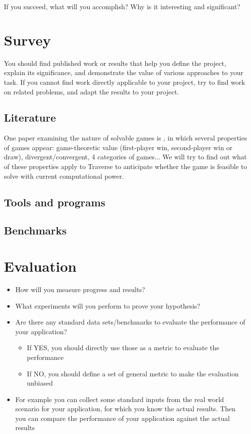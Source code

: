 \documentclass[times, 10pt,twocolumn]{article}
\begin{document}

If you succeed, what will you accomplish? Why is it interesting and significant?


\section{Survey}
You should find published work or results that help you define the project, explain its significance, and demonstrate the value of various approaches to your task. If you cannot find work directly applicable to your project, try to find work on related problems, and adapt the results to your project.

\subsection{Literature}
One paper examining the nature of solvable games is \cite{games_solved}, in which several properties of games appear: game-theoretic value (first-player win, second-player win or draw), divergent/convergent, 4 categories of games... We will try to find out what of these properties apply to Traverse to anticipate whether the game is feasible to solve with current computational power.

\subsection{Tools and programs}

\subsection{Benchmarks}

\section{Evaluation}

\begin{itemize}
	\item{How will you measure progress and results?}
	\item{What experiments will you perform to prove your hypothesis?}
	\item{Are there any standard data sets/benchmarks to evaluate the performance of your application?}
	\begin{itemize}
		\item{If YES, you should directly use those as a metric to evaluate the performance}
		\item{If NO, you should define a set of general metric to make the evaluation unbiased}
	\end{itemize}
	\item{For example you can collect some standard inputs from the real world scenario for your application, for which you know the actual results. Then you can compare the performance of your application against the actual results}
\end{itemize}
\end{document}
